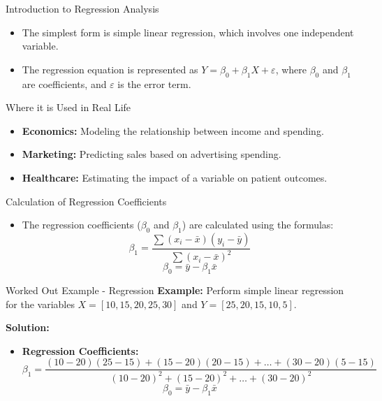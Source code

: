 \begin{frame}{Introduction to Regression Analysis}
  \begin{itemize}
    \item The simplest form is simple linear regression, which involves one independent variable.
    \item The regression equation is represented as \(Y = \beta_0 + \beta_1X + \varepsilon\), where \(\beta_0\) and \(\beta_1\) are coefficients, and \(\varepsilon\) is the error term.
  \end{itemize}
\end{frame}

\begin{frame}{Where it is Used in Real Life}
  \begin{itemize}
    \item \textbf{Economics:} Modeling the relationship between income and spending.
    \item \textbf{Marketing:} Predicting sales based on advertising spending.
    \item \textbf{Healthcare:} Estimating the impact of a variable on patient outcomes.
  \end{itemize}
\end{frame}

\begin{frame}{Calculation of Regression Coefficients}
  \begin{itemize}
    \item The regression coefficients (\(\beta_0\) and \(\beta_1\)) are calculated using the formulas:
    \[ \beta_1 = \frac{\sum{(x_i - \bar{x})(y_i - \bar{y})}}{\sum{(x_i - \bar{x})^2}} \]
    \[ \beta_0 = \bar{y} - \beta_1\bar{x} \]
  \end{itemize}
\end{frame}

\begin{frame}{Worked Out Example - Regression}
  \textbf{Example:} Perform simple linear regression for the variables \(X = [10, 15, 20, 25, 30]\) and \(Y = [25, 20, 15, 10, 5]\).

  \textbf{Solution:}
  \begin{itemize}
    \item \textbf{Regression Coefficients:} \[ \beta_1 = \frac{(10-20)(25-15) + (15-20)(20-15) + \ldots + (30-20)(5-15)}{(10-20)^2 + (15-20)^2 + \ldots + (30-20)^2} \]
    \[ \beta_0 = \bar{y} - \beta_1\bar{x} \]
  \end{itemize}
\end{frame}


